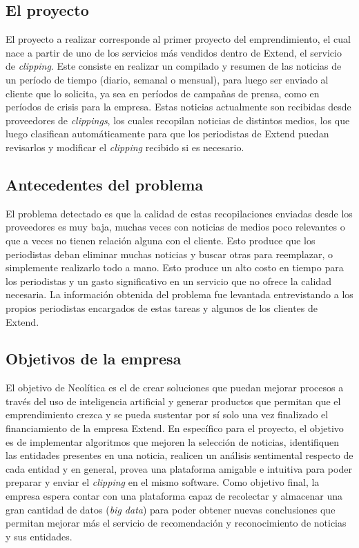 \subsection{El proyecto}

El proyecto a realizar corresponde al primer proyecto del emprendimiento, el cual nace a partir de uno de los servicios más vendidos dentro de Extend, el servicio de \textit{clipping}. Este consiste en realizar un compilado y resumen de las noticias de un período de tiempo (diario, semanal o mensual), para luego ser enviado al cliente que lo solicita, ya sea en períodos de campañas de prensa, como en períodos de crisis para la empresa. Estas noticias actualmente son recibidas desde proveedores de \textit{clippings}, los cuales recopilan noticias de distintos medios, los que luego clasifican automáticamente para que los periodistas de Extend puedan revisarlos y modificar el \textit{clipping} recibido si es necesario.

\subsection{Antecedentes del problema}

El problema detectado es que la calidad de estas recopilaciones enviadas desde los proveedores es muy baja, muchas veces con noticias de medios poco relevantes o que a veces no tienen relación alguna con el cliente. Esto produce que los periodistas deban eliminar muchas noticias y buscar otras para reemplazar, o simplemente realizarlo todo a mano. Esto produce un alto costo en tiempo para los periodistas y un gasto significativo en un servicio que no ofrece la calidad necesaria.
La información obtenida del problema fue levantada entrevistando a los propios periodistas encargados de estas tareas y algunos de los clientes de Extend.

\subsection{Objetivos de la empresa}

El objetivo de Neolítica es el de crear soluciones que puedan mejorar procesos a través del uso de inteligencia artificial y generar productos que permitan que el emprendimiento crezca y se pueda sustentar por sí solo una vez finalizado el financiamiento de la empresa Extend.
En específico para el proyecto, el objetivo es de implementar algoritmos que mejoren la selección de noticias, identifiquen las entidades presentes en una noticia, realicen un análisis sentimental respecto de cada entidad y en general, provea una plataforma amigable e intuitiva para poder preparar y enviar el \textit{clipping} en el mismo software. Como objetivo final, la empresa espera contar con una plataforma capaz de recolectar y almacenar una gran cantidad de datos (\textit{big data}) para poder obtener  nuevas conclusiones que permitan mejorar más el servicio de recomendación y reconocimiento de noticias y sus entidades.




